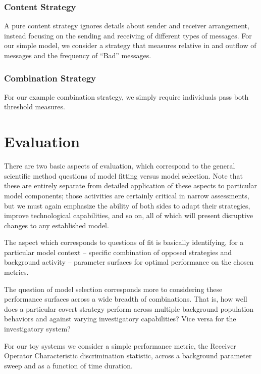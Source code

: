 \documentclass{article}
\begin{document}
\subsubsection*{Content Strategy}
A pure content strategy ignores details about sender and receiver arrangement, instead focusing on the sending and receiving of different types of messages.  For our simple model, we consider a strategy that measures relative in and outflow of messages and the frequency of ``Bad'' messages.

\subsubsection*{Combination Strategy}
For our example combination strategy, we simply require individuals pass both threshold measures.

\section*{Evaluation}
There are two basic aspects of evaluation, which correspond to the general scientific method questions of model fitting versus model selection.  Note that these are entirely separate from detailed application of these aspects to particular model components; those activities are certainly critical in narrow assessments, but we must again emphasize the ability of both sides to adapt their strategies, improve technological capabilities, and so on, all of which will present disruptive changes to any established model.

The aspect which corresponds to questions of fit is basically identifying, for a particular model context -- specific combination of opposed strategies and background activity -- parameter surfaces for optimal performance on the chosen metrics.

The question of model selection corresponds more to considering these performance surfaces across a wide breadth of combinations.  That is, how well does a particular covert strategy perform across multiple background population behaviors and against varying investigatory capabilities?  Vice versa for the investigatory system?

For our toy systems we consider a simple performance metric, the Receiver Operator Characteristic discrimination statistic, across a background parameter sweep and as a function of time duration. 
\end{document}
